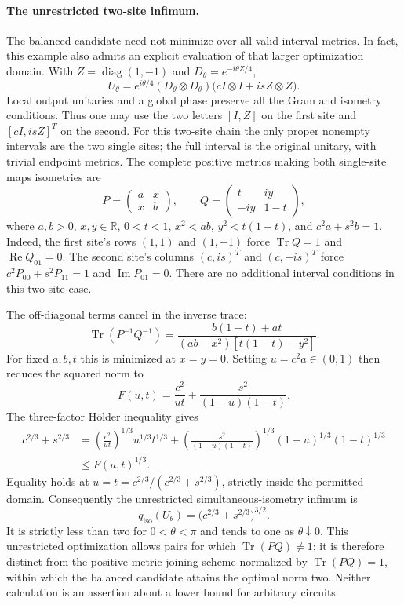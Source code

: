 \documentclass[11pt]{article}
\begin{document}
\paragraph{The unrestricted two-site infimum.}
The balanced candidate need not minimize over all valid interval metrics.
In fact, this example also admits an explicit evaluation of that larger
optimization domain. With $Z=\operatorname{diag}(1,-1)$ and
$D_\theta=e^{-i\theta Z/4}$,
\[
 U_\theta=e^{i\theta/4}(D_\theta\otimes D_\theta)
       \bigl(cI\otimes I+i sZ\otimes Z\bigr).
\]
Local output unitaries and a global phase preserve all the Gram and
isometry conditions. Thus one may use the two letters $[I,Z]$ on the
first site and $[cI,i sZ]^T$ on the second. For this two-site chain the
only proper nonempty intervals are the two single sites; the full
interval is the original unitary, with trivial endpoint metrics.
The complete positive metrics making both single-site maps isometries
are
\[
 P=\begin{pmatrix}a&x\\x&b\end{pmatrix},\qquad
 Q=\begin{pmatrix}t&i y\\-i y&1-t\end{pmatrix},
\]
where $a,b>0$, $x,y\in\mathbb R$, $0<t<1$,
$x^2<ab$, $y^2<t(1-t)$, and $c^2a+s^2b=1$.
Indeed, the first site's rows $(1,1)$ and $(1,-1)$ force
$\operatorname{Tr}Q=1$ and $\operatorname{Re}Q_{01}=0$.
The second site's columns $(c,i s)^T$ and $(c,-i s)^T$ force
$c^2P_{00}+s^2P_{11}=1$ and $\operatorname{Im}P_{01}=0$.
There are no additional interval conditions in this two-site case.

The off-diagonal terms cancel in the inverse trace:
\[
 \operatorname{Tr}(P^{-1}Q^{-1})
 =\frac{b(1-t)+at}{(ab-x^2)[t(1-t)-y^2]}.
\]
For fixed $a,b,t$ this is minimized at $x=y=0$.
Setting $u=c^2a\in(0,1)$ then reduces the squared norm to
\[
 F(u,t)=\frac{c^2}{ut}
       +\frac{s^2}{(1-u)(1-t)}.
\]
The three-factor H\"older inequality gives
\[
\begin{split}
 c^{2/3}+s^{2/3}
 &=\left(\frac{c^2}{ut}\right)^{1/3}u^{1/3}t^{1/3}
   +\left(\frac{s^2}{(1-u)(1-t)}\right)^{1/3}
       (1-u)^{1/3}(1-t)^{1/3}\\
 &\le F(u,t)^{1/3}.
\end{split}
\]
Equality holds at
$u=t=c^{2/3}/(c^{2/3}+s^{2/3})$, strictly inside the permitted domain.
Consequently the unrestricted simultaneous-isometry infimum is
\[
 \boxed{\displaystyle q_{\mathrm{iso}}(U_\theta)
   =\bigl(c^{2/3}+s^{2/3}\bigr)^{3/2}.}
\]
It is strictly less than two for $0<\theta<\pi$ and tends to one as
$\theta\downarrow0$. This unrestricted optimization allows pairs for
which $\operatorname{Tr}(PQ)\ne1$; it is therefore distinct from the
positive-metric joining scheme normalized by
$\operatorname{Tr}(PQ)=1$, within which the balanced candidate attains
the optimal norm two. Neither calculation is an assertion about a
lower bound for arbitrary circuits.
\end{document}
